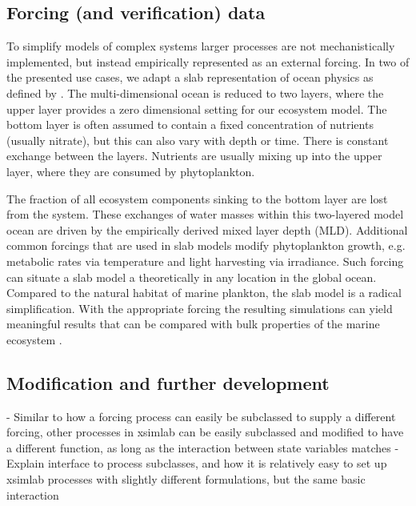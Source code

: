 \documentclass[template.tex]{subfiles}
\begin{document}
\subsection{Forcing (and verification) data} \label{Section:ForcingSection}

To simplify models of complex systems larger processes are not mechanistically implemented, but instead empirically represented as an external forcing. In two of the presented use cases, we adapt a slab representation of ocean physics as defined by \citet{Evans1985ACycles}. The multi-dimensional ocean is reduced to two layers, where the upper layer provides a zero dimensional setting for our ecosystem model. The bottom layer is often assumed to contain a fixed concentration of nutrients (usually nitrate), but this can also vary with depth or time. There is constant exchange between the layers. Nutrients are usually mixing up into the upper layer, where they are consumed by phytoplankton. 

The fraction of all ecosystem components sinking to the bottom layer are lost from the system. These exchanges of water masses within this two-layered model ocean are driven by the empirically derived mixed layer depth (MLD). Additional common forcings that are used in slab models modify phytoplankton growth, e.g. metabolic rates via temperature and light harvesting via irradiance. Such forcing can situate a slab model a theoretically in any location in the global ocean. Compared to the natural habitat of marine plankton, the slab model is a radical simplification. With the appropriate forcing the resulting simulations can yield meaningful results that can be compared with bulk properties of the marine ecosystem \cite[e.g.][]{Evans1985ACycles, Fasham1990a}. 

\subsection{Modification and further development}

- Similar to how a forcing process can easily be subclassed to supply a different forcing, other processes in xsimlab can be easily subclassed and modified to have a different function, as long as the interaction between state variables matches
- Explain interface to process subclasses, and how it is relatively easy to set up xsimlab processes with slightly different  formulations, but the same basic interaction

\end{document}
